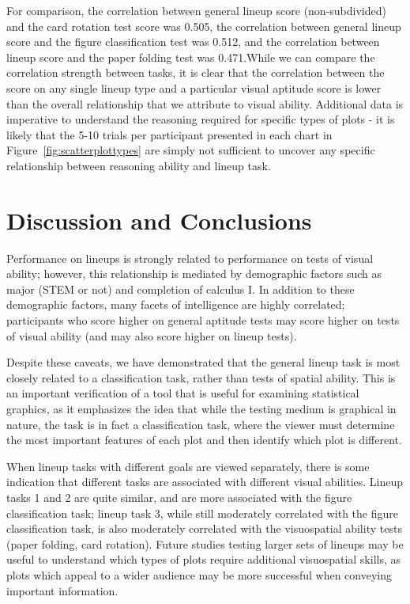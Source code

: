 \documentclass[11pt]{isuthesis}\usepackage[]{graphicx}\usepackage[]{color}
\begin{document}
For comparison, the correlation between general lineup score (non-subdivided) and the card rotation test score was 0.505, the correlation between general lineup score and the figure classification test was 0.512, and the correlation between lineup score and the paper folding test was 0.471.While we can compare the correlation strength between tasks, it is clear that the correlation between the score on any single lineup type and a particular visual aptitude score is lower than the overall relationship that we attribute to visual ability. Additional data is imperative to understand the reasoning required for specific types of plots - it is likely that the 5-10 trials per participant presented in each chart in Figure~\ref{fig:scatterplottypes} are simply not sufficient to uncover any specific relationship between reasoning ability and lineup task. 



\section{Discussion and Conclusions}\label{sec:discussion}

Performance on lineups is strongly related to performance on tests of visual ability; however, this relationship is mediated by demographic factors such as major (STEM or not) and completion of calculus I.
In addition to these demographic factors, many facets of intelligence are highly correlated; participants who score higher on general aptitude tests may score higher on tests of visual ability (and may also score higher on lineup tests).

Despite these caveats, we have demonstrated that the general lineup task is most closely related to a classification task, rather than tests of spatial ability.
This is an important verification of a tool that is useful for examining statistical graphics, as it emphasizes the idea that while the testing medium is graphical in nature, the task is in fact a classification task, where the viewer must determine the most important features of each plot and then identify which plot is different.

When lineup tasks with different goals are viewed separately, there is some indication that different tasks are associated with different visual abilities.
Lineup tasks 1 and 2 are quite similar, and are more associated with the figure classification task; lineup task 3, while still moderately correlated with the figure classification task, is also moderately correlated with the visuospatial ability tests (paper folding, card rotation).
Future studies testing larger sets of lineups may be useful to understand which types of plots require additional visuospatial skills, as plots which appeal to a wider audience may be more successful when conveying important information.
\end{document}
